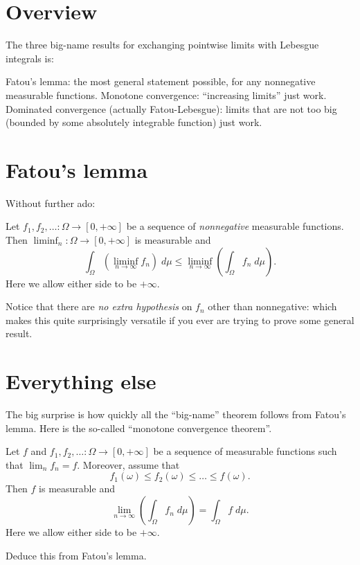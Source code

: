 \section{Overview}
The three big-name results for exchanging
pointwise limits with Lebesgue integrals is:
\begin{itemize}
	\ii Fatou's lemma: the most general statement possible,
	for any nonnegative measurable functions.
	\ii Monotone convergence: ``increasing limits'' just work.
	\ii Dominated convergence (actually Fatou-Lebesgue):
	limits that are not too big
	(bounded by some absolutely integrable function) just work.
\end{itemize}

\section{Fatou's lemma}
Without further ado:
\begin{lemma}
	Let $f_1, f_2, \dots \colon \Omega \to [0,+\infty]$
	be a sequence of \emph{nonnegative} measurable functions.
	Then $\liminf_n \colon \Omega \to [0,+\infty]$ is measurable and
	\[ \int_\Omega \left( \liminf_{n \to \infty} f_n \right) \; d\mu
		\le \liminf_{n \to \infty} \left( \int_\Omega f_n \; d\mu \right).  \]
	Here we allow either side to be $+\infty$.
\end{lemma}
Notice that there are \emph{no extra hypothesis}
on $f_n$ other than nonnegative: which makes this quite surprisingly versatile
if you ever are trying to prove some general result.

\section{Everything else}
The big surprise is how quickly all the ``big-name''
theorem follows from Fatou's lemma.
Here is the so-called ``monotone convergence theorem''.
\begin{corollary}
	Let $f$ and $f_1, f_2, \dots \colon \Omega \to [0,+\infty]$
	be a sequence of measurable functions such that $\lim_n f_n = f$.
	Moreover, assume that
	\[ f_1(\omega) \le f_2(\omega) \le \dots \le f(\omega). \]
	Then $f$ is measurable and
	\[ \lim_{n \to \infty} \left( \int_\Omega f_n \; d\mu \right)
		= \int_\Omega f \; d\mu. \]
	Here we allow either side to be $+\infty$.
\end{corollary}
\begin{ques}
	Deduce this from Fatou's lemma.
\end{ques}

